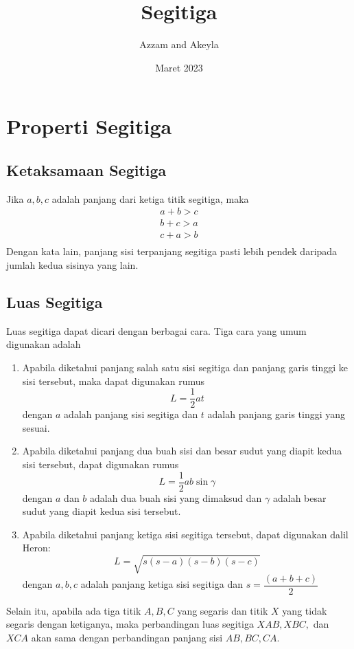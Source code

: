 \documentclass[11pt]{scrartcl}
\title{Segitiga}
\author{Azzam and Akeyla}
\date{Maret 2023}
\begin{document}
\maketitle

\renewcommand*\contentsname{Daftar Isi}
\tableofcontents

\newpage

\section{Properti Segitiga}
\subsection{Ketaksamaan Segitiga}
Jika $a,b,c$ adalah panjang dari ketiga titik segitiga, maka 
\begin{align*}
    a+b>c\\
    b+c>a\\
    c+a>b\\
\end{align*}
Dengan kata lain, panjang sisi terpanjang segitiga pasti lebih pendek daripada jumlah kedua sisinya yang lain.

\subsection{Luas Segitiga}
Luas segitiga dapat dicari dengan berbagai cara. Tiga cara yang umum digunakan adalah
\begin{enumerate}
    \item Apabila diketahui panjang salah satu sisi segitiga dan panjang garis tinggi ke sisi tersebut, maka dapat digunakan rumus \[L= \dfrac{1}{2}at\] dengan $a$ adalah panjang sisi segitiga dan $t$ adalah panjang garis tinggi yang sesuai.
    \item Apabila diketahui panjang dua buah sisi dan besar sudut yang diapit kedua sisi tersebut, dapat digunakan rumus \[L = \dfrac{1}{2} ab \sin{\gamma}\] dengan $a$ dan $b$ adalah dua buah sisi yang dimaksud dan $\gamma$ adalah besar sudut yang diapit kedua sisi tersebut.
    \item Apabila diketahui panjang ketiga sisi segitiga tersebut, dapat digunakan dalil Heron: \[L=\sqrt{s(s-a)(s-b)(s-c)}\] dengan $a,b,c$ adalah panjang ketiga sisi segitiga dan $s=\dfrac{(a+b+c)}{2}$
\end{enumerate}
Selain itu, apabila ada tiga titik $A, B, C$ yang segaris dan titik $X$ yang tidak segaris dengan ketiganya, maka perbandingan luas segitiga $XAB, XBC,$ dan $XCA$ akan sama dengan perbandingan panjang sisi $AB, BC, CA$.
\end{document}
